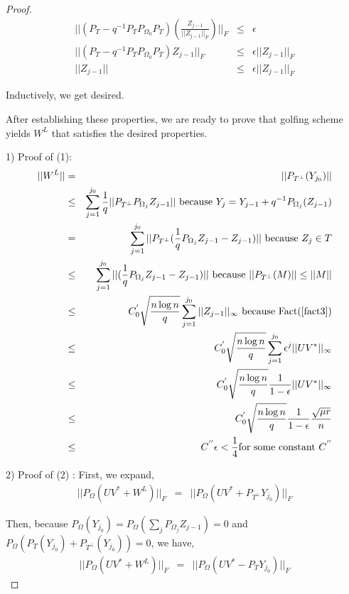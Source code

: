 \documentclass{../common/projectreport}
\begin{document}
\begin{proof}
\begin{eqnarray*}
||(P_{T}-q^{-1}P_{T}P_{\Omega_{0}}P_{T})(\frac{Z_{j-1}}{||Z_{j-1}||_{F}})||_{F} & \le & \epsilon\\
||(P_{T}-q^{-1}P_{T}P_{\Omega_{0}}P_{T})Z_{j-1}||_{F} & \le & \epsilon||Z_{j-1}||_{F}\\
||Z_{j-1}|| & \le & \epsilon||Z_{j-1}||_{F}
\end{eqnarray*}


Inductively, we get desired.

After establishing these properties, we are ready to prove that golfing scheme yields $W^{L}$ that satisfies the desired properties.

1) Proof of (1): 
\begin{eqnarray*}
||W^{L}|| & = & ||P_{T^{\bot}}(Y_{j_{0}})||\\
 & \le & \sum_{j=1}^{j_{0}}\frac{1}{q}||P_{T^{\bot}}P_{\Omega_{j}}Z_{j-1}||\text{ because }Y_{j}=Y_{j-1}+q^{-1}P_{\Omega_{j}}(Z_{j-1})\\
 & = & \sum_{j=1}^{j_{0}}||P_{T^{\bot}}(\frac{1}{q}P_{\Omega_{j}}Z_{j-1}-Z_{j-1})||\text{ because }Z_{j}\in T\\
 & \le & \sum_{j=1}^{j_{0}}||(\frac{1}{q}P_{\Omega_{j}}Z_{j-1}-Z_{j-1})||\text{ because }||P_{T^{\bot}}(M)||\le||M||\\
 & \le & C_{0}^{'}\sqrt{\frac{n\log n}{q}}\sum_{j=1}^{j_{0}}||Z_{j-1}||_{\infty}\text{ because Fact(\ref{fact3})}\\
 & \le & C_{0}^{'}\sqrt{\frac{n\log n}{q}}\sum_{j=1}^{j_{0}}\epsilon^{j}||UV^{*}||_{\infty}\\
 & \le & C_{0}^{'}\sqrt{\frac{n\log n}{q}}\frac{1}{1-\epsilon}||UV^{*}||_{\infty}\\
 & \le & C_{0}^{'}\sqrt{\frac{n\log n}{q}}\frac{1}{1-\epsilon}\frac{\sqrt{\mu r}}{n}\\
 & \le & C^{''}\epsilon<\frac{1}{4}\text{for some constant }C^{''}
\end{eqnarray*}


2) Proof of (2) : First, we expand, 
\begin{eqnarray*}
||P_{\Omega}(UV^{*}+W^{L})||_{F} & = & ||P_{\Omega}(UV^{*}+P_{T^{\bot}}Y_{j_{0}})||_{F}
\end{eqnarray*}

Then, because $P_{\Omega}(Y_{j_{0}})=P_{\Omega}(\sum_{j}P_{\Omega_{j}}Z_{j-1})=0$ and $P_{\Omega}(P_{T}(Y_{j_{0}})+P_{T^{\bot}}(Y_{j_{0}}))=0$, we have, 
\begin{eqnarray*}
||P_{\Omega}(UV^{*}+W^{L})||_{F} & = & ||P_{\Omega}(UV^{*}-P_{T}Y_{j_{0}})||_{F}
\end{eqnarray*}



\end{proof}
\end{document}
